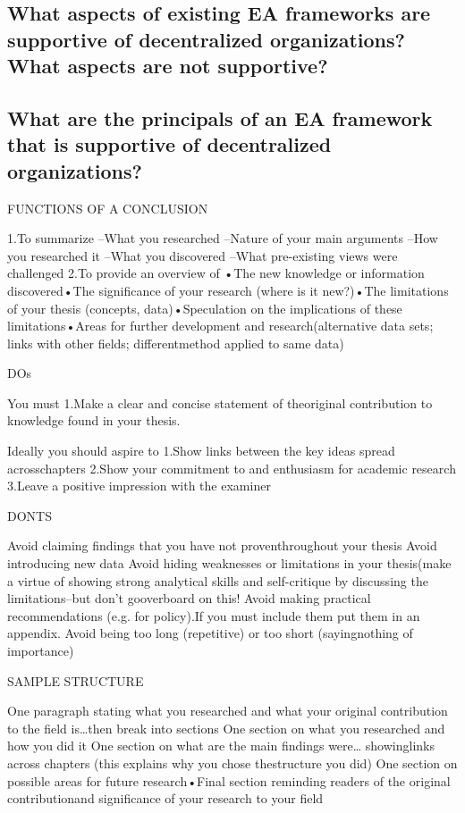\subsection{What aspects of existing EA frameworks are supportive of decentralized organizations? What aspects are not supportive?}


\subsection{What are the principals of an EA framework that is supportive of decentralized organizations?}





FUNCTIONS OF A CONCLUSION

1.To summarize
 –What you researched –Nature of your main arguments –How you researched it –What you discovered –What pre-existing views were challenged
2.To provide an overview of 
•The new knowledge or information discovered•The significance of your research (where is it new?)•The limitations of your thesis (concepts, data)•Speculation on the implications of these limitations•Areas for further development and research(alternative data sets; links with other fields; differentmethod applied to same data)


DOs

You must 
1.Make a clear and concise statement of theoriginal contribution to knowledge found in your thesis.

Ideally you should aspire to
1.Show links between the key ideas spread acrosschapters
2.Show your commitment to and enthusiasm for academic research
3.Leave a positive impression with the examiner


DONTS

Avoid claiming findings that you have not proventhroughout your thesis
Avoid introducing new data
Avoid hiding weaknesses or limitations in your thesis(make a virtue of showing strong analytical skills and self-critique by discussing the limitations--but don’t gooverboard on this!
Avoid making practical recommendations (e.g. for policy).If you must include them put them in an appendix.
Avoid being too long (repetitive) or too short (sayingnothing of importance)


SAMPLE STRUCTURE

One paragraph stating what you researched and what your original contribution to the field is…then break into sections
One section on what you researched and how you did it
One section on what are the main findings were… showinglinks across chapters (this explains why you chose thestructure you did)
One section on possible areas for future research•Final section reminding readers of the original contributionand significance of your research to your field